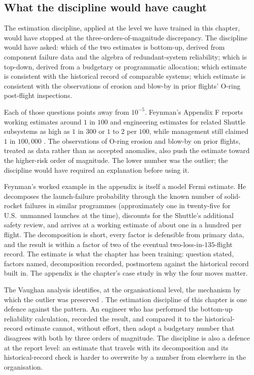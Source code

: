 \subsection{What the discipline would have caught}

The estimation discipline, applied at the level we have trained in
this chapter, would have stopped at the three-orders-of-magnitude
discrepancy. The discipline would have asked: which of the two
estimates is bottom-up, derived from component failure data and the
algebra of redundant-system reliability; which is top-down, derived
from a budgetary or programmatic allocation; which estimate is
consistent with the historical record of comparable systems; which
estimate is consistent with the observations of erosion and blow-by
in prior flights' O-ring post-flight inspections.

Each of those questions points away from $10^{-5}$. Feynman's
Appendix F reports working estimates around $1$ in $100$ and
engineering estimates for related Shuttle subsystems as high as $1$
in $300$ or $1$ to $2$ per $100$, while management still claimed $1$
in $100{,}000$ \cite{paper:ch09-feynman-appendix-f}. The observations
of O-ring erosion and blow-by on prior flights, treated as data
rather than as accepted anomalies, also push the estimate toward the
higher-risk order of magnitude. The lower number was the outlier; the
discipline would have required an explanation before using it.

Feynman's worked example in the appendix is itself a model Fermi
estimate. He decomposes the launch-failure probability through the
known number of solid-rocket failures in similar programmes
(approximately one in twenty-five for U.S.\ unmanned launches at the
time), discounts for the Shuttle's additional safety review, and
arrives at a working estimate of about one in a hundred per flight.
The decomposition is short, every factor is defensible from primary
data, and the result is within a factor of two of the eventual
two-loss-in-$135$-flight record. The estimate is what the chapter has
been training: question stated, factors named, decomposition
recorded, postmortem against the historical record built in. The
appendix is the chapter's case study in why the four moves matter.

The Vaughan analysis identifies, at the organisational level, the
mechanism by which the outlier was preserved \cite{hist:vaughan1996}.
The estimation discipline of this chapter is one defence against the
pattern. An engineer who has performed the bottom-up reliability
calculation, recorded the result, and compared it to the
historical-record estimate cannot, without effort, then adopt a
budgetary number that disagrees with both by three orders of
magnitude. The discipline is also a defence at the report level: an
estimate that travels with its decomposition and its
historical-record check is harder to overwrite by a number from
elsewhere in the organisation.

